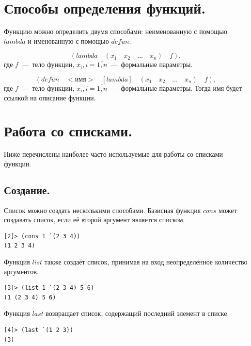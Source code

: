 \section{Способы определения функций.}
Функцию можно определить двумя способами: неименованную с помощью $lambda$ и именованную с помощью $defun$.

\begin{equation}
	\nonumber (lambda \quad (x_1 \quad x_2 \quad ... \quad x_n) \quad f),
\end{equation}
где $f$~---~тело функции, $x_i, i = \overline{1, n}$~---~формальные параметры.

\begin{equation}
	\nonumber (defun \quad <\text{имя}> \quad [lambda] \quad (x_1 \quad x_2 \quad ... \quad x_n) \quad f),
\end{equation}
где $f$~---~тело функции, $x_i, i = \overline{1, n}$~---~формальные параметры. Тогда имя будет ссылкой на описание функции.


\section{Работа со списками.}

Ниже перечислены наиболее часто используемые для работы со списками функции.

\subsection{Создание.}
Список можно создать несколькими способами. Базисная функция $cons$ может создавать список, если её второй аргумент является списком.
 
\begin{code}
\begin{verbatim}
[2]> (cons 1 `(2 3 4))
(1 2 3 4)
\end{verbatim}
\end{code}

Функция $list$ также создаёт список, принимая на вход неопределённое количество аргументов.

\begin{code}
\begin{verbatim}
[3]> (list 1 `(2 3 4) 5 6)
(1 (2 3 4) 5 6)
\end{verbatim}
\end{code}

Функция $last$ возвращает список, содержащий последний элемент в списке.

\begin{code}
\begin{verbatim}
[4]> (last `(1 2 3))
(3)
\end{verbatim}
\end{code}

